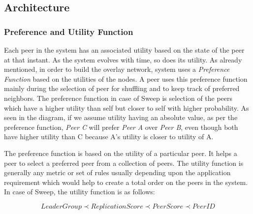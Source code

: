 \documentclass[a4paper, 11pt]{article}
\begin{document}
\subsection{Architecture}

\subsubsection*{Preference and Utility Function}

Each peer in the system has an associated utility based on the state of the peer at that instant. As the system evolves with time, so does its utility. As already mentioned, in order to build the overlay network, system uses a \textit {Preference Function} based on the utilities of the nodes. A peer uses this preference function mainly during the selection of peer for shuffling and to keep track of preferred neighbors. The preference function in case of  Sweep is selection of the peers which have a higher utility than self but closer to self with higher probability. As seen in the diagram, if we assume utility having an absolute value, as per the preference function, \textit{Peer C} will prefer \textit{Peer A} over \textit{Peer B}, even though both have higher utility than C because A's utility is closer to utility of A.

\par The preference function is based on the utility of a particular peer. It helps a peer to select a preferred peer from a collection of peers. The utility function is generally any metric or set of rules usually depending upon the application requirement which would help to create a total order on the peers in the system. In case of Sweep, the utility function is as follows:

\small 
\begin{equation*}
    LeaderGroup \prec ReplicationScore \prec PeerScore \prec PeerID
\end{equation*}
\normalsize
\end{document}
